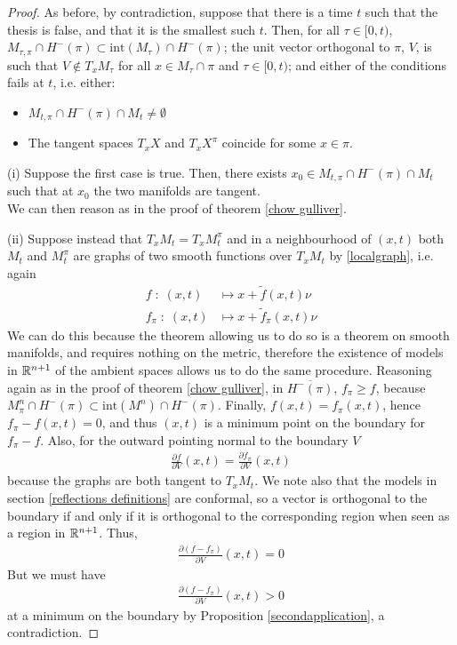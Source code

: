 \begin{proof}
	As before, by contradiction, suppose that there is a time $t$ such that the thesis is false, and that it is the smallest such $t$. Then, for all $\tau \in [0,t)$, $M_{\tau,\pi}\cap H^-(\pi)\subset \mathrm{int}(M_{\tau})\cap H^-(\pi)$; the unit vector orthogonal to $\pi$, $V$, is such that $V\notin T_xM_\tau$ for all $x\in M_\tau\cap \pi$ and $\tau \in [0,t)$; and either of the conditions fails at $t$, i.e. either: 
	\begin{itemize}
		\item[(i)] $M_{t,\pi}\cap H^-(\pi)\cap M_{t}\neq \emptyset$
		\item[(ii)] The tangent spaces $T_xX$ and $T_xX^\pi$ coincide for some $x\in\pi$. 
	\end{itemize} 
	
	(i) Suppose the first case is true. Then, there exists $x_0 \in M_{t,\pi}\cap H^-(\pi)\cap M_{t}$ such that at $x_0$ the two manifolds are tangent. \\
	We can then reason as in the proof of theorem \ref{chow gulliver}.
	
	(ii) Suppose instead that  $T_xM_t= T_xM_t^\pi$ and in a neighbourhood of $(x, t)$ both $M_t$ and $M_t^\pi$ are graphs of two smooth functions over $T_xM_t$ by \ref{localgraph}, i.e. again
	\begin{align*}
		f \; : \; (x, t) &\mapsto x+\tilde{f}(x, t)\nu \\
		f_\pi \; : \; (x, t) &\mapsto x+\tilde{f}_\pi(x, t)\nu 
	\end{align*} 
	We can do this because the theorem allowing us to do so is a theorem on smooth manifolds, and requires nothing on the metric, therefore the existence of models in $\mathbb{R}^{n+1}$ of the ambient spaces allows us to do the same procedure. 
	Reasoning again as in the proof of theorem \ref{chow gulliver}, in $\overline{H^-(\pi)}$, $f_\pi\geq f$, because $M^n_\pi\cap H^-(\pi)\subset \mathrm{int}(M^n)\cap H^-(\pi)$. Finally, $f(x, t)=f_\pi (x, t)$, hence $f_\pi-f (x, t)=0$, and thus  $(x, t)$ is a minimum point on the boundary for $f_\pi-f$. Also, for the outward pointing normal to the boundary $V$
	\begin{align*}
		\frac{\partial f}{\partial V}(x,t)=\frac{\partial f_\pi}{\partial V}(x,t)
	\end{align*}
	because the graphs are both tangent to $T_xM_t$. We note also that the models in section \ref{reflections definitions} are conformal, so a vector is orthogonal to the boundary if and only if it is orthogonal to the corresponding region when seen as a region in $\mathbb{R}^{n+1}$. Thus, 
	\begin{align*}
		\frac{\partial (f- f_\pi)}{\partial V}(x,t)=0
	\end{align*}
	But we must have 
	\begin{align*}
		\frac{\partial (f- f_\pi)}{\partial V}(x,t)>0
	\end{align*}
	at a minimum on the boundary by Proposition \ref{secondapplication}, a contradiction.  
\end{proof}
